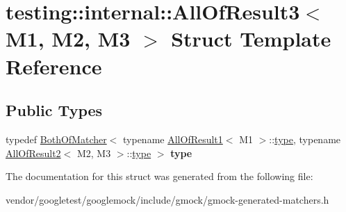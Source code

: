 \hypertarget{structtesting_1_1internal_1_1_all_of_result3}{}\section{testing\+:\+:internal\+:\+:All\+Of\+Result3$<$ M1, M2, M3 $>$ Struct Template Reference}
\label{structtesting_1_1internal_1_1_all_of_result3}
\subsection*{Public Types}
\begin{DoxyCompactItemize}
\item 
\mbox{\label{structtesting_1_1internal_1_1_all_of_result3_a18073a23acd542bccf3a6c5d7f72f957}} 
typedef \mbox{\hyperlink{classtesting_1_1internal_1_1_both_of_matcher}{Both\+Of\+Matcher}}$<$ typename \mbox{\hyperlink{structtesting_1_1internal_1_1_all_of_result1}{All\+Of\+Result1}}$<$ M1 $>$\+::\mbox{\hyperlink{classtesting_1_1internal_1_1_both_of_matcher}{type}}, typename \mbox{\hyperlink{structtesting_1_1internal_1_1_all_of_result2}{All\+Of\+Result2}}$<$ M2, M3 $>$\+::\mbox{\hyperlink{classtesting_1_1internal_1_1_both_of_matcher}{type}} $>$ {\bfseries type}
\end{DoxyCompactItemize}


The documentation for this struct was generated from the following file\+:\begin{DoxyCompactItemize}
\item 
vendor/googletest/googlemock/include/gmock/gmock-\/generated-\/matchers.\+h\end{DoxyCompactItemize}
